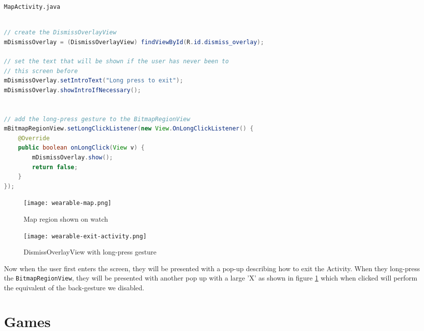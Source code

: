 \texttt{MapActivity.java}
\begin{lstlisting}[language=Java]

// create the DismissOverlayView
mDismissOverlay = (DismissOverlayView) findViewById(R.id.dismiss_overlay);

// set the text that will be shown if the user has never been to
// this screen before
mDismissOverlay.setIntroText("Long press to exit");
mDismissOverlay.showIntroIfNecessary();


// add the long-press gesture to the BitmapRegionView
mBitmapRegionView.setLongClickListener(new View.OnLongClickListener() {
    @Override
    public boolean onLongClick(View v) {
        mDismissOverlay.show();
        return false;
    }
});

\end{lstlisting}

\begin{figure}
    \centering
    \texttt{[image: wearable-map.png]}
    \caption{Map region shown on watch}
    \label{fig:wearable_map}
    \texttt{[image: wearable-exit-activity.png]}
    \caption{DismissOverlayView with long-press gesture}
    \label{fig:wearable_dismiss_overlay}
\end{figure}

Now when the user first enters the screen, they will be presented with a pop-up
describing how to exit the Activity. When they long-press the
\texttt{BitmapRegionView}, they will be presented with another pop up with a
large 'X' as shown in figure \ref{fig:wearable_dismiss_overlay} which when
clicked will perform the equivalent of the back-gesture we disabled.



\clearpage
\section{Games}

